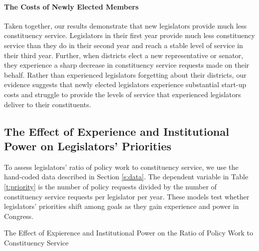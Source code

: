 \documentclass[12pt]{article}
\begin{document}
\paragraph{The Costs of Newly Elected Members} Taken together, our results demonstrate that new legislators provide much less constituency service. Legislators in their first year provide much less constituency service than they do in their second year and reach a stable level of service in their third year. Further, when districts elect a new representative or senator, they experience a sharp decrease in constituency service requests made on their behalf. Rather than experienced legislators forgetting about their districts, our evidence suggests that newly elected legislators experience substantial start-up costs and struggle to provide the levels of service that experienced legislators deliver to their constituents.  


\subsection{The Effect of Experience and Institutional Power on Legislators' Priorities}\label{s:priority} 
To assess legislators' ratio of policy work to constituency service, we use the hand-coded data described in Section \ref{s:data}. The dependent variable in Table \ref{t:priority} is the number of policy requests divided by the number of constituency service requests per legislator per year. These models test whether legislators' priorities shift among goals as they gain experience and power in Congress.

\begin{table}
\begin{center}
\begin{minipage}{\textwidth}
\caption{The Effect of Expierence and Institutional Power on the Ratio of Policy Work to Constituency Service} \label{t:priority}
\centering

\end{minipage}
\end{center}
\end{table}
\end{document}
